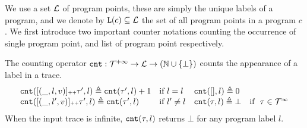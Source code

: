 We use a set $\mathcal{L}$ of program points, these are simply the unique labels of a program, and we denote by $\mathtt{L}(c) \subseteq \mathcal{L}$ the set of all program points in a program $c$.  
%
We first introduce two important counter notations counting the occurrence of single program point, and list of program point respectively.
\begin{defn}
  \label{def:counter}
The counting operator $\mathtt{cnt} : \mathcal{T}^{+\infty} \to \mathcal{L} \to (\mathbb{N} \cup \{\bot\})$
counts the appearance of a label in a trace.
\[
\begin{array}{llll}
\mathtt{cnt}([(\_, l, v)] {\scriptscriptstyle ++} \mathtt{\tau}', l ) \triangleq \mathtt{cnt}(\mathtt{\tau}', l) + 1 & \text{if}~ l = l
&
\mathtt{cnt}({[]}, l) \triangleq 0 & 
\\
\mathtt{cnt}([(\_, l', v)] {\scriptscriptstyle ++} \mathtt{\tau}', l) \triangleq \mathtt{cnt}(\mathtt{\tau}', l)   & \text{if}~ l' \neq l
&
\mathtt{cnt}(\mathtt{\tau}, l) \triangleq \bot & \text{if }~ \mathtt{\tau} \in \mathcal{T}^{\infty}
\end{array}
\]
{When the input trace is infinite, $\mathtt{cnt}(\mathtt{\tau}, l)$ returns $\bot$ for any program label $l$.}
\end{defn}
